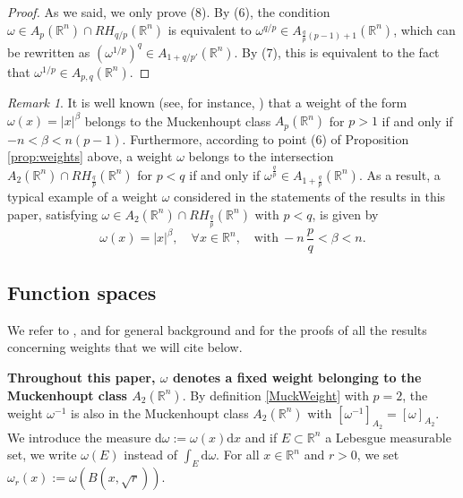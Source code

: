 \documentclass[12pt, letterpaper]{amsart}
\theoremstyle{definition}
\theoremstyle{remark}
\newtheorem{rem}[thm]{Remark}
\numberwithin{equation}{section}
\begin{document}
\begin{proof} As we said, we only prove (8).
By (6), the condition $\omega \in A_p(\mathbb{R}^n) \cap RH_{q/p}(\mathbb{R}^n)$ is equivalent to $\omega^{{q}/{p}} \in A_{\frac{q}{p}(p-1)+1}(\mathbb{R}^n)$, which can be rewritten as $(\omega^{{1}/{p}})^q \in A_{1+{q}/{p'}}(\mathbb{R}^n)$. By (7), this is equivalent  to the fact that $\omega^{{1}/{p}} \in A_{p,q}(\mathbb{R}^n)$.
 \end{proof}


\begin{rem}
   It is well known (see, for instance, \cite[Example 7.1.7]{grafakos2008classical}) that a weight of the form $\omega(x) = |x|^\beta$ belongs to the Muckenhoupt class $A_p(\mathbb{R}^n)$ for $p > 1$ if and only if $-n < \beta < n(p-1)$. Furthermore, according to point (6) of Proposition \ref{prop:weights} above, a weight $\omega$ belongs to the intersection $A_2(\mathbb{R}^n) \cap RH_{\frac{q}{p}}(\mathbb{R}^n)$ for $p < q$ if and only if $\omega^{\frac{q}{p}} \in A_{1+\frac{q}{p}}(\mathbb{R}^n)$. As a result, a typical example of a weight $\omega$ considered in the statements of the results in this paper, satisfying $\omega \in A_2(\mathbb{R}^n) \cap RH_{\frac{q}{p}}(\mathbb{R}^n)$ with $p < q$, is given by
    \begin{equation*}
        \omega(x) = |x|^\beta, \quad \forall x \in \mathbb{R}^n, \quad \text{with} \ -n\, \frac{p}{q} < \beta < n.
    \end{equation*}

\end{rem}


\subsection{Function spaces}

We refer to \cite[Ch. V]{Stein1993_HA}, \cite{garcia2011weighted} and \cite[Chapter 7]{grafakos2008classical} for general background and for the proofs of all the results concerning weights that we will cite below.

\textbf{Throughout this paper, $\omega$ denotes a fixed weight belonging to the Muckenhoupt class $A_2(\mathbb{R}^n )$}. By definition \eqref{MuckWeight} with $p=2$, the weight $\omega^{-1}$ is also in the Muckenhoupt class $A_2(\mathbb{R}^n )$ with $  [ \omega^{-1}  ]_{A_2}=  [ \omega  ]_{A_2}$. We introduce the measure $\mathrm d \omega := \omega(x) \mathrm d x$ and if $E \subset \mathbb{R}^n$ a Lebesgue measurable set, we write $\omega(E)$ instead of $\int_E \mathrm d \omega$. For all $x \in \mathbb{R}^n$ and $r>0$, we set $\omega_r(x):=\omega(B(x,\sqrt{r}))$. 
\end{document}
